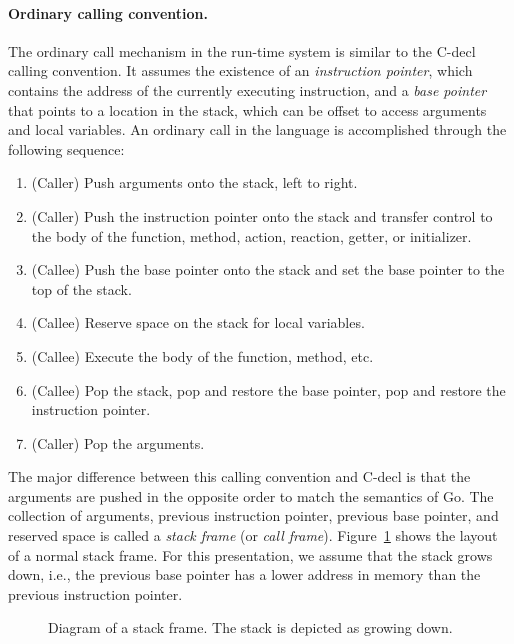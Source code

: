 \paragraph{Ordinary calling convention.}
The ordinary call mechanism in the \rcgo{} run-time system is similar to the C-decl calling convention.
It assumes the existence of an \emph{instruction pointer}, which contains the address of the currently executing instruction, and a \emph{base pointer} that points to a location in the stack, which can be offset to access arguments and local variables.
An ordinary call in the language is accomplished through the following sequence:
\begin{enumerate}
\item (Caller) Push arguments onto the stack, left to right.
\item (Caller) Push the instruction pointer onto the stack and transfer control to the body of the function, method, action, reaction, getter, or initializer.
\item (Callee) Push the base pointer onto the stack and set the base pointer to the top of the stack.
\item (Callee) Reserve space on the stack for local variables.
\item (Callee) Execute the body of the function, method, etc.
\item (Callee) Pop the stack, pop and restore the base pointer, pop and restore the instruction pointer.
\item (Caller) Pop the arguments.
\end{enumerate}
The major difference between this calling convention and C-decl is that the arguments are pushed in the opposite order to match the semantics of Go.
The collection of arguments, previous instruction pointer, previous base pointer, and reserved space is called a \emph{stack frame} (or \emph{call frame}).
Figure~\ref{frame} shows the layout of a normal stack frame.
For this presentation, we assume that the stack grows down, i.e., the previous base pointer has a lower address in memory than the previous instruction pointer.

\begin{figure}
\centering
{}%
\caption{Diagram of a stack frame\label{frame}.  The stack is depicted as growing down.}
\end{figure}

